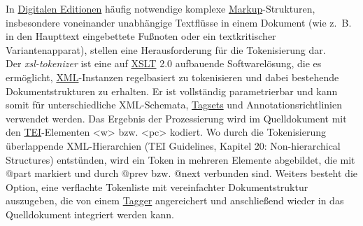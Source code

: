 \documentclass{article}
\begin{document}
        In \href{http://gams.uni-graz.at/o:konde.59}{Digitalen Editionen} häufig
                  notwendige komplexe \href{http://gams.uni-graz.at/o:konde.126}{Markup}-Strukturen, insbesondere voneinander unabhängige Textflüsse in einem
                  Dokument (wie z. B. in den Haupttext eingebettete Fußnoten oder ein textkritischer
                  Variantenapparat), stellen eine Herausforderung für die Tokenisierung dar.\\
            
        Der \emph{xsl-tokenizer} ist eine auf \href{http://gams.uni-graz.at/o:konde.86}{XSLT} 2.0 aufbauende Softwarelösung, die es
                  ermöglicht, \href{http://gams.uni-graz.at/o:konde.215}{XML}-Instanzen
                  regelbasiert zu tokenisieren und dabei bestehende Dokumentstrukturen zu erhalten.
                  Er ist vollständig parametrierbar und kann somit für unterschiedliche
                  XML-Schemata, \href{http://gams.uni-graz.at/o:konde.177}{Tagsets} und
                  Annotationsrichtlinien verwendet werden. Das Ergebnis der Prozessierung wird im
                  Quelldokument mit den \href{http://gams.uni-graz.at/o:konde.178}{TEI}-Elementen <w> bzw. <pc> kodiert. Wo durch die Tokenisierung
                  überlappende XML-Hierarchien (TEI Guidelines, Kapitel 20: Non-hierarchical
                     Structures) entstünden, wird ein Token in mehreren Elemente abgebildet,
                  die mit @part markiert und durch @prev bzw. @next verbunden sind. Weiters besteht die Option, eine verflachte
                  Tokenliste mit vereinfachter Dokumentstruktur auszugeben, die von einem \href{http://gams.uni-graz.at/o:konde.176}{Tagger} angereichert und
                  anschließend wieder in das Quelldokument integriert werden kann.\\
            
\end{document}
